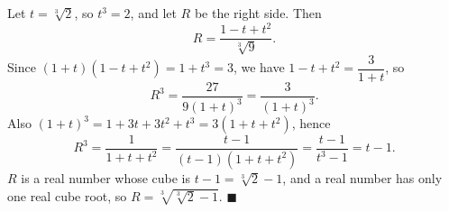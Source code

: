 Let $t=\sqrt[3]2$, so $t^3=2$, and let $R$ be the right side. Then
\[R=\dfrac{1-t+t^2}{\sqrt[3]9}.\]
Since $(1+t)\left(1-t+t^2\right)=1+t^3=3$, we have $1-t+t^2=\dfrac3{1+t}$, so
\[R^3=\dfrac{27}{9(1+t)^3}=\dfrac{3}{(1+t)^3}.\]
Also $(1+t)^3=1+3t+3t^2+t^3=3\left(1+t+t^2\right)$, hence
\[R^3=\dfrac1{1+t+t^2}=\dfrac{t-1}{(t-1)\left(1+t+t^2\right)}=\dfrac{t-1}{t^3-1}=t-1.\]
$R$ is a real number whose cube is $t-1=\sqrt[3]2-1$, and a real number has only one real cube root, so $R=\sqrt[3]{\sqrt[3]2-1}$. $\blacksquare$
